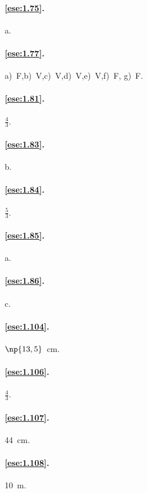 \paragraph{\ref{ese:1.75}.}
a.

\paragraph{\ref{ese:1.77}.}
a)~F,\quad b)~V,\quad c)~V,\quad d)~V,\quad e)~V,\quad f)~F,\quad 
g)~F.

\paragraph{\ref{ese:1.81}.}
$\frac{4}{3}$.

\paragraph{\ref{ese:1.83}.}
b.

\paragraph{\ref{ese:1.84}.}
$\frac{5}{3}$.

\paragraph{\ref{ese:1.85}.}
a.

\paragraph{\ref{ese:1.86}.}
c.

\paragraph{\ref{ese:1.104}.}
$\np{13,5}$~cm.

\paragraph{\ref{ese:1.106}.}
$\frac{4}{3}$.

\paragraph{\ref{ese:1.107}.}
44~cm.

\paragraph{\ref{ese:1.108}.}
10~m.


